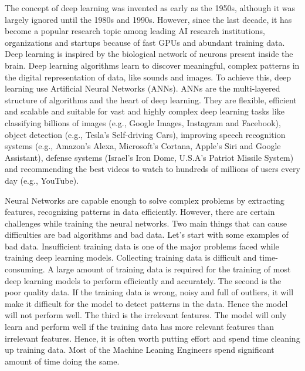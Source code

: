 The concept of deep learning was invented as early as the 1950s, although it was largely ignored until the 1980s and 1990s. However, since the last decade, it has become a popular research topic among leading \ac{AI} research institutions, organizations and startups because of fast GPUs and abundant training data. Deep learning is inspired by the biological network of neurons present inside the brain. Deep learning algorithms learn to discover meaningful, complex patterns in the digital representation of data, like sounds and images. To achieve this, deep learning use Artificial Neural Networks (\acp{ANN}). \acp{ANN} are the multi-layered structure of algorithms and the heart of deep learning. They are flexible, efficient and scalable and suitable for vast and highly complex deep learning tasks like classifying billions of images (e.g., Google Images, Instagram and Facebook), object detection (e.g., Tesla's Self-driving Cars), improving speech recognition systems (e.g., Amazon's Alexa, Microsoft's Cortana, Apple's Siri and Google Assistant), defense systems (Israel's Iron Dome, U.S.A's Patriot Missile System) and recommending the best videos to watch to hundreds of millions of users every day (e.g., YouTube).

Neural Networks are capable enough to solve complex problems by extracting features, recognizing patterns in data efficiently. However, there are certain challenges while training the neural networks. Two main things that can cause difficulties are bad algorithms and bad data. Let's start with some examples of bad data. Insufficient training data is one of the major problems faced while training deep learning models. Collecting training data is difficult and time-consuming. A large amount of training data is required for the training of most deep learning models to perform efficiently and accurately. The second is the poor quality data. If the training data is wrong, noisy and full of outliers, it will make it difficult for the model to detect patterns in the data. Hence the model will not perform well. The third is the irrelevant features. The model will only learn and perform well if the training data has more relevant features than irrelevant features. Hence, it is often worth putting effort and spend time cleaning up training data. Most of the Machine Leaning Engineers spend significant amount of time doing the same. 



